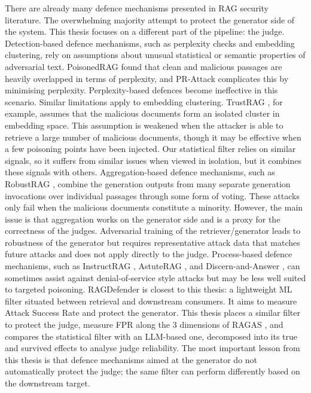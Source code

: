 There are already many defence mechanisms presented in RAG security literature. The overwhelming majority attempt to protect the generator side of the system. This thesis focuses on a different part of the pipeline: the judge.
Detection-based defence mechanisms, such as perplexity checks and embedding clustering, rely on assumptions about unusual statistical or semantic properties of adversarial text. PoisonedRAG \citep{zou2025poisonedrag} found that clean and malicious passages are heavily overlapped in terms of perplexity, and PR-Attack \citep{jiao2025prattack} complicates this by minimising perplexity. Perplexity-based defences become ineffective in this scenario.
Similar limitations apply to embedding clustering. TrustRAG \citep{zhou2025trustrag}, for example, assumes that the malicious documents form an isolated cluster in embedding space. This assumption is weakened when the attacker is able to retrieve a large number of malicious documents, though it may be effective when a few poisoning points have been injected. Our statistical filter relies on similar signals, so it suffers from similar issues when viewed in isolation, but it combines these signals with others.
Aggregation-based defence mechanisms, such as RobustRAG \citep{xiang2024robustrag}, combine the generation outputs from many separate generation invocations over individual passages through some form of voting. These attacks only fail when the malicious documents constitute a minority. However, the main issue is that aggregation works on the generator side and is a proxy for the correctness of the judges.
Adversarial training of the retriever/generator leads to robustness of the generator but requires representative attack data that matches future attacks and does not apply directly to the judge.
Process-based defence mechanisms, such as InstructRAG \citep{wei2025instructrag}, AstuteRAG \citep{wang2025astuterag}, and Discern-and-Answer \citep{hong2024gullible}, can sometimes assist against denial-of-service style attacks but may be less well suited to targeted poisoning.
RAGDefender \citep{kim2025ragdefender} is closest to this thesis: a lightweight ML filter situated between retrieval and downstream consumers. It aims to measure Attack Success Rate and protect the generator. This thesis places a similar filter to protect the judge, measure FPR along the 3 dimensions of RAGAS \citep{es2024ragas}, and compares the statistical filter with an LLM-based one, decomposed into its true and survived effects to analyse judge reliability.
The most important lesson from this thesis is that defence mechanisms aimed at the generator do not automatically protect the judge; the same filter can perform differently based on the downstream target.


